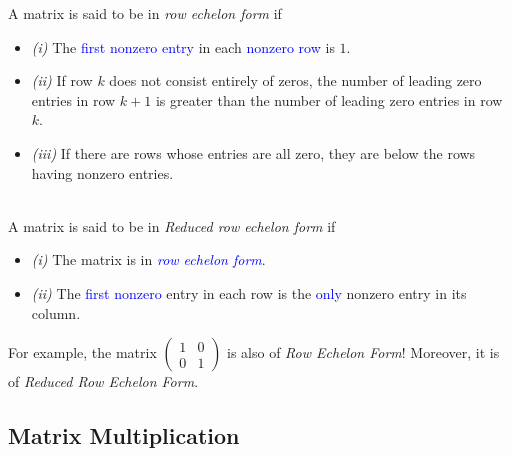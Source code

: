 \begin{definition}
A matrix is said to be in \emph{row echelon form} if
\begin{itemize}
\item
 \emph{(i)} The \textcolor{blue}{first nonzero entry} in each \textcolor{blue}{nonzero row} is $1$.
 \item
\emph{(ii)} If row $k$ does not consist entirely of zeros, the number of leading zero entries in row $k + 1$ is greater than the number of leading zero entries in row $k$.
\item
\emph{(iii)} If there are rows whose entries are all zero, they are below the rows having nonzero entries.
\end{itemize}
\end{definition}
\begin{definition} \qquad \\
A matrix is said to be in \emph{Reduced row echelon form} if
\begin{itemize}
\item
 \emph{(i)} The matrix is in \textcolor{blue}{\textit{row echelon form}}. 
 \item
\emph{(ii)} The \textcolor{blue}{first nonzero} entry in each row is the \textcolor{blue}{only} nonzero entry in its column.
\end{itemize}
\end{definition}
For example, the matrix $\begin{pmatrix}
1 & 0 \\ 0 & 1
\end{pmatrix}$ is also of \textit{Row Echelon Form}! Moreover, it is of \textit{Reduced Row Echelon Form}.
\subsection{Matrix Multiplication}
